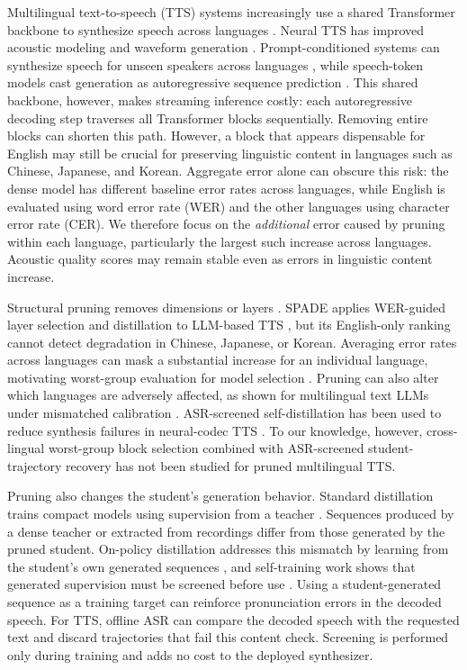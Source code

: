 \documentclass{article}
\begin{document}
Multilingual text-to-speech (TTS) systems increasingly use a shared
Transformer backbone to synthesize speech across languages
\cite{du2024cosyvoice,du2025cosyvoice3}. Neural TTS has improved
acoustic modeling and waveform generation
\cite{shen2018naturaltts}. Prompt-conditioned systems can synthesize
speech for unseen speakers across languages
\cite{casanova2022yourtts,le2023voicebox}, while speech-token models
cast generation as autoregressive sequence prediction
\cite{wang2023neuralcodec,kharitonov2023speak}. This shared backbone,
however, makes streaming inference costly: each autoregressive
decoding step traverses all Transformer blocks sequentially.
Removing entire blocks can shorten this path. However, a block that
appears dispensable for English may still be crucial for preserving
linguistic content in languages such as Chinese,
Japanese, and Korean. Aggregate error alone can obscure this risk:
the dense model has different baseline error rates across languages,
while English is evaluated using word error rate (WER) and the other
languages using character error rate (CER). We therefore focus on the
\emph{additional} error caused by pruning within each language,
particularly the largest such increase across languages. Acoustic
quality scores may remain stable even as errors in linguistic content
increase.

Structural pruning removes dimensions or layers
\cite{ma2023llmpruner,ashkboos2024slicegpt,men2025shortgpt}. SPADE applies
WER-guided layer selection and distillation to LLM-based TTS
\cite{nguyen2026spade}, but its English-only ranking cannot detect
degradation in Chinese, Japanese, or Korean. Averaging error rates
across languages can mask a substantial increase for an individual
language, motivating worst-group evaluation for model selection
\cite{sagawa2020dro}. Pruning can also alter which languages are
adversely affected, as shown for multilingual text LLMs under mismatched
calibration \cite{kurz2026limitations}. ASR-screened self-distillation
has been used to reduce synthesis failures in neural-codec TTS
\cite{asaria2026reliable}. To our knowledge, however, cross-lingual
worst-group block selection combined with ASR-screened student-trajectory
recovery has not been studied for pruned multilingual TTS.

Pruning also changes the student's generation behavior. Standard
distillation trains compact models using supervision from a teacher
\cite{hinton2015distilling,kim2016sequence}. Sequences produced by a
dense teacher or extracted from recordings differ from those generated
by the pruned student. On-policy distillation addresses this mismatch
by learning from the student's own generated sequences
\cite{agarwal2024onpolicy}, and self-training work shows that generated
supervision must be screened before use \cite{park2020improved}.
Using a student-generated sequence as a training target can reinforce
pronunciation errors in the decoded speech. For TTS, offline ASR can
compare the decoded speech with the requested text and discard
trajectories that fail this content check. Screening is performed
only during training and adds no cost to the deployed synthesizer.
\end{document}
